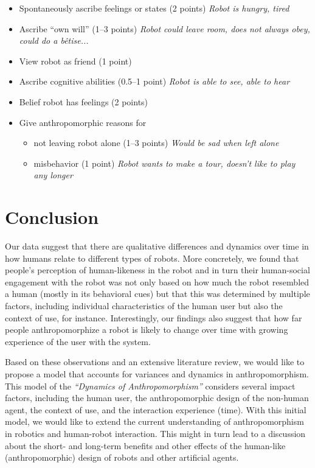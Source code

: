 \documentclass{frontiersSCNS} %
\begin{document}
\begin{itemize}
    \item Spontaneously ascribe feelings or states (2 points) {\it Robot is
        hungry, tired}
    \item Ascribe ``own will'' (1--3 points) {\it Robot could leave room, does not
        always obey, could do a b\^{e}tise...}
    \item View robot as friend (1 point)
    \item Ascribe cognitive abilities (0.5--1 point) {\it Robot is able to see,
        able to hear}
    \item Belief robot has feelings (2 points)
    \item Give anthropomorphic reasons for
        \begin{itemize}
            \item not leaving robot alone (1--3 points) {\it Would be sad when
                left alone}
            \item misbehavior (1 point) {\it Robot wants to make a tour, doesn't
                like to play any longer}
        \end{itemize}
\end{itemize}




%
%
%
%
%
%


\section{Conclusion}
\label{sec:conclusion}

Our data suggest that there are qualitative differences and dynamics over time
in how humans relate to different types of robots. More concretely, we found
that people's perception of human-likeness in the robot and in turn their
human-social engagement with the robot was not only based on how much the robot
resembled a human (mostly in its behavioral cues) but that this was determined
by multiple factors, including individual characteristics of the human user but
also the context of use, for instance. Interestingly, our findings also suggest
that how far people anthropomorphize a robot is likely to change over time with
growing experience of the user with the system. 

Based on these observations and an extensive literature review, we would like to
propose a model that accounts for variances and dynamics in anthropomorphism.
This model of the \textit{``Dynamics of Anthropomorphism''} considers several
impact factors, including the human user, the anthropomorphic design of the
non-human agent, the context of use, and the interaction experience (time). With
this initial model, we would like to extend the current understanding of
anthropomorphism in robotics and human-robot interaction. This might in turn
lead to a discussion about the short- and long-term benefits and other effects
of the human-like (anthropomorphic) design of robots and other artificial
agents.
\end{document}
